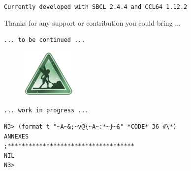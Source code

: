 \documentclass{article}
\begin{document}
\bigskip

\texttt{\small Currently developed with SBCL 2.4.4 and CCL64 1.12.2}

\bigskip

Thanks for any support or contribution you could bring ...

\bigskip 
\bigskip

\centerline{\texttt{{\footnotesize ... to be continued ...}}}
\begin{figure}[htbp]
\begin{center}
\includegraphics[width=2.7cm]{2223}
\end{center}
\end{figure}
\vspace{-5mm}
\centerline{\texttt{{\footnotesize ... work in progress ...}}}

\bigskip
\bigskip
\bigskip
\bigskip
\bigskip

\begin{lstlisting}[language=sectitle]
N3> (format t "~A~&;~v@{~A~:*~}~&" *CODE* 36 #\*)
ANNEXES
;************************************
NIL
N3> 
\end{lstlisting}

\end{document}
